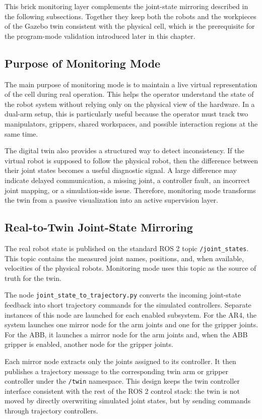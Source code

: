 This brick monitoring layer complements the joint-state mirroring described in the
following subsections. Together they keep both the robots and the workpieces of the
Gazebo twin consistent with the physical cell, which is the prerequisite for the
program-mode validation introduced later in this chapter.
\subsection{Purpose of Monitoring Mode}

The main purpose of monitoring mode is to maintain a live virtual representation of the cell during real operation. This helps the operator understand the state of the robot system without relying only on the physical view of the hardware. In a dual-arm setup, this is particularly useful because the operator must track two manipulators, grippers, shared workspaces, and possible interaction regions at the same time.

The digital twin also provides a structured way to detect inconsistency. If the virtual robot is supposed to follow the physical robot, then the difference between their joint states becomes a useful diagnostic signal. A large difference may indicate delayed communication, a missing joint, a controller fault, an incorrect joint mapping, or a simulation-side issue. Therefore, monitoring mode transforms the twin from a passive visualization into an active supervision layer.

\subsection{Real-to-Twin Joint-State Mirroring}

The real robot state is published on the standard ROS 2 topic \texttt{/joint\_states}. This topic contains the measured joint names, positions, and, when available, velocities of the physical robots. Monitoring mode uses this topic as the source of truth for the twin.

The node \texttt{joint\_state\_to\_trajectory.py} converts the incoming joint-state feedback into short trajectory commands for the simulated controllers. Separate instances of this node are launched for each enabled subsystem. For the AR4, the system launches one mirror node for the arm joints and one for the gripper joints. For the ABB, it launches a mirror node for the arm joints and, when the ABB gripper is enabled, another node for the gripper joints.

Each mirror node extracts only the joints assigned to its controller. It then publishes a trajectory message to the corresponding twin arm or gripper controller under the \texttt{/twin} namespace. This design keeps the twin controller interface consistent with the rest of the ROS 2 control stack: the twin is not moved by directly overwriting simulated joint states, but by sending commands through trajectory controllers.

